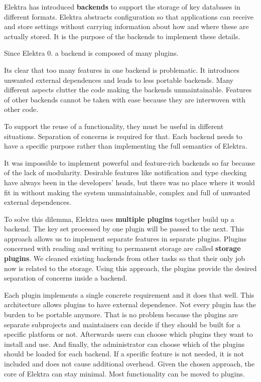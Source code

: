 Elektra has introduced {\bfseries backends} to support the storage of key databases in different formats. Elektra abstracts configuration so that applications can receive and store settings without carrying information about how and where these are actually stored. It is the purpose of the backends to implement these details.

Since Elektra 0. a backend is composed of many plugins.

Its clear that too many features in one backend is problematic. It introduces unwanted external dependences and leads to less portable backends. Many different aspects clutter the code making the backends unmaintainable. Features of other backends cannot be taken with ease because they are interwoven with other code.

To support the reuse of a functionality, they must be useful in different situations. Separation of concerns is required for that. Each backend needs to have a specific purpose rather than implementing the full semantics of Elektra.

It was impossible to implement powerful and feature-\/rich backends so far because of the lack of modularity. Desirable features like notification and type checking have always been in the developers' heads, but there was no place where it would fit in without making the system unmaintainable, complex and full of unwanted external dependences.

To solve this dilemma, Elektra uses {\bfseries multiple plugins} together build up a backend. The key set processed by one plugin will be passed to the next. This approach allows us to implement separate features in separate plugins. Plugins concerned with reading and writing to permanent storage are called {\bfseries storage plugins}. We cleaned existing backends from other tasks so that their only job now is related to the storage. Using this approach, the plugins provide the desired separation of concerns inside a backend.

Each plugin implements a single concrete requirement and it does that well. This architecture allows plugins to have external dependence. Not every plugin has the burden to be portable anymore. That is no problem because the plugins are separate subprojects and maintainers can decide if they should be built for a specific platform or not. Afterwards users can choose which plugins they want to install and use. And finally, the administrator can choose which of the plugins should be loaded for each backend. If a specific feature is not needed, it is not included and does not cause additional overhead. Given the chosen approach, the core of Elektra can stay minimal. Most functionality can be moved to plugins.

